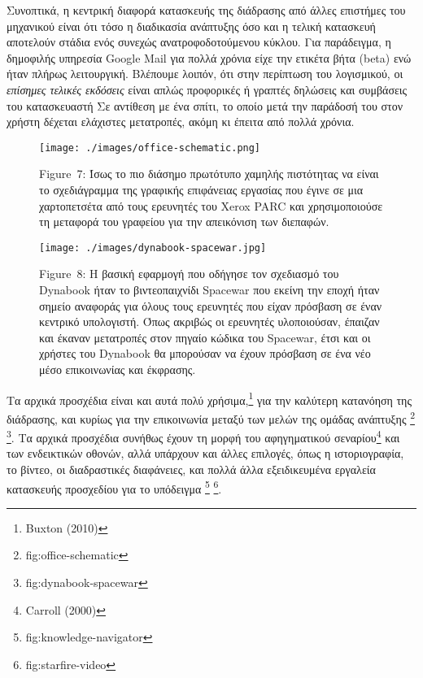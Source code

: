 \documentclass[
]{article}
\begin{document}
Συνοπτικά, η κεντρική διαφορά κατασκευής της διάδρασης από άλλες
επιστήμες του μηχανικού είναι ότι τόσο η διαδικασία ανάπτυξης όσο και η
τελική κατασκευή αποτελούν στάδια ενός συνεχώς ανατροφοδοτούμενου
κύκλου. Για παράδειγμα, η δημοφιλής υπηρεσία Google Mail για πολλά
χρόνια είχε την ετικέτα βήτα (beta) ενώ ήταν πλήρως λειτουργική.
Βλέπουμε λοιπόν, ότι στην περίπτωση του λογισμικού, οι \emph{επίσημες
τελικές εκδόσεις} είναι απλώς προφορικές ή γραπτές δηλώσεις και
συμβάσεις του κατασκευαστή Σε αντίθεση με ένα σπίτι, το οποίο μετά την
παράδοσή του στον χρήστη δέχεται ελάχιστες μετατροπές, ακόμη κι έπειτα
από πολλά χρόνια.

\leavevmode{}%
\begin{figure}
\hypertarget{fig:office-schematic}{%
\centering
\texttt{[image: ./images/office-schematic.png]}
\caption{Figure~7: Ίσως το πιο διάσημο πρωτότυπο χαμηλής πιστότητας να
είναι το σχεδιάγραμμα της γραφικής επιφάνειας εργασίας που έγινε σε μια
χαρτοπετσέτα από τους ερευνητές του Xerox PARC και χρησιμοποιούσε τη
μεταφορά του γραφείου για την απεικόνιση των
διεπαφών.}\label{fig:office-schematic}
}
\end{figure}

\leavevmode{}%
\begin{figure}
\hypertarget{fig:dynabook-spacewar}{%
\centering
\texttt{[image: ./images/dynabook-spacewar.jpg]}
\caption{Figure~8: Η βασική εφαρμογή που οδήγησε τον σχεδιασμό του
Dynabook ήταν το βιντεοπαιχνίδι Spacewar που εκείνη την εποχή ήταν
σημείο αναφοράς για όλους τους ερευνητές που είχαν πρόσβαση σε έναν
κεντρικό υπολογιστή. Όπως ακριβώς οι ερευνητές υλοποιούσαν, έπαιζαν και
έκαναν μετατροπές στον πηγαίο κώδικα του Spacewar, έτσι και οι χρήστες
του Dynabook θα μπορούσαν να έχουν πρόσβαση σε ένα νέο μέσο επικοινωνίας
και έκφρασης.}\label{fig:dynabook-spacewar}
}
\end{figure}

Τα αρχικά προσχέδια είναι και αυτά πολύ χρήσιμα,\footnote{Buxton (2010)}
για την καλύτερη κατανόηση της διάδρασης, και κυρίως για την επικοινωνία
μεταξύ των μελών της ομάδας ανάπτυξης \footnote{fig:office-schematic}
\footnote{fig:dynabook-spacewar}. Τα αρχικά προσχέδια συνήθως έχουν τη
μορφή του αφηγηματικού σεναρίου\footnote{Carroll (2000)} και των
ενδεικτικών οθονών, αλλά υπάρχουν και άλλες επιλογές, όπως η
ιστοριογραφία, το βίντεο, οι διαδραστικές διαφάνειες, και πολλά άλλα
εξειδικευμένα εργαλεία κατασκευής προσχεδίου για το υπόδειγμα
\footnote{fig:knowledge-navigator} \footnote{fig:starfire-video}.
\end{document}
